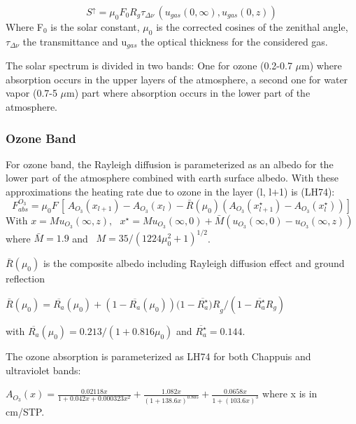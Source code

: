 \begin{equation}
S^\uparrow =\mu_{0} F_{0} R_{g}\tau_{\Delta \nu}\, (u_{gas}(
0,\infty), u_{gas}(0,z))
\end{equation}
Where F$_{0}$ is the solar constant, $\mu_{0}$ is the corrected cosines of the
zenithal angle, $\tau_{\Delta \nu}$ the transmittance and u$_{gas}$ the
optical thickness for the considered gas.

The solar spectrum is divided in two bands: One for ozone (0.2-0.7 $\mu$m)
where absorption occurs in the upper layers of the atmosphere, a second one
for water vapor (0.7-5 $\mu$m) part where absorption occurs in the lower
part of the atmosphere.

\subsubsection{Ozone Band}

For ozone band, the Rayleigh diffusion is parameterized as an albedo for the
lower part of the atmosphere combined with earth surface albedo. With these
approximations the heating rate due to ozone in the layer (l, l$+$1) is
(LH74):
\begin{equation}
F_{abs}^{O_{3}}=\mu_{0}F\, [\, A_{O_{3}}\left( x_{l+1} \right)-A_{O_{3}}\left( x_{l}
\right)-\bar{R}(\mu_{0})\left( A_{O_{3}}\left( x_{l+1}^{\star }
\right)-A_{O_{3}}\left( x_{l}^{\star } \right) \right)]
\end{equation}
With $x=Mu_{O_{3}}\left( \infty ,z \right),\, \, \, \, x^{\star }=Mu_{O_{3}}\left(
\infty ,0 \right)+\bar{M}(u_{O_{3}}\left( \infty ,0 \right)-u_{O_{3}}\left( \infty
,z \right))$ \\
where $\bar{M}=1.9$ and $\, \, \, M=35/{(1224\mu
_{0}^{2}+1)}^{1/2}$.

$\bar{R}(\mu_{0})$ is the composite albedo including Rayleigh diffusion
effect and ground reflection

$\bar{R}\left( \mu_{0} \right)=\overline{R_{a}}\left( \mu_{0}
\right)+(1-\overline{R_{a}}\left( \mu_{0} \right))(1-\overline{R_{a}^{\star
}}{)R}_{g}/(1-\overline{R_{a}^{\star }}R_{g})$

with $\overline{R_{a}}\left( \mu_{0}
\right)=0.213/(1+0.816\mu_{0})$ and $\overline{R_{a}^{\star }}=0.144$.

The ozone absorption is parameterized as LH74 for both Chappuis and
ultraviolet bands:

$A_{O_{3}}\left( x
\right)=\frac{0.02118x}{1+0.042x+0.000323x^{2}}+\frac{1.082x}{{(1+138.6x)}^{0.805}}+\frac{0.0658x}{1+{(103.6x)}^{3}}$
where x is in cm/STP.


